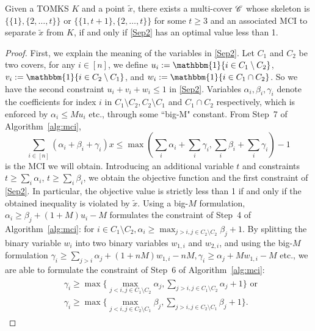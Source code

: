\begin{theorem}
\label{theo: sep_2}
Given a TOMKS $K$ and a point $\tilde x$, there exists a multi-cover $\mathscr{C}$ whose skeleton is $\{\{1\}, \{2, \ldots, t\}\}$ or $\{\{1,t+1\}, \{2, \ldots, t\}\}$ for some $t \geq 3$ and an associated MCI to separate $\tilde x$ from $K$, if and only if \eqref{Sep2} has an optimal value less than 1. 
\end{theorem}

\begin{proof}
First, we explain the meaning of the variables in \eqref{Sep2}. 
Let $C_1$ and $C_2$ be two covers, for any $i \in [n]$, we define $u_i := \mathbbm{1}\{i \in C_1 \setminus C_2\}$, $v_i := \mathbbm{1}\{i \in C_2 \setminus C_1\}$, and $w_i: = \mathbbm{1}\{i \in C_1 \cap C_2\}$. 
So we have the second constraint $u_i + v_i + w_i \leq 1$ in \eqref{Sep2}. 
Variables $\alpha_i, \beta_i, \gamma_i$ denote the coefficients for index $i$ in $C_1 \setminus C_2, C_2 \setminus C_1$ and $C_1 \cap C_2$ respectively, which is enforced by $\alpha_i \leq M u_i$ etc., through some ``big-M" constant. 
From Step~7 of Algorithm~\ref{alg:mci}, 
$$
\sum_{i \in [n]} (\alpha_i + \beta_i + \gamma_i) x \leq \max(\sum_{i} \alpha_i + \sum_{i} \gamma_i, \sum_{i} \beta_i + \sum_{i}\gamma_i) - 1
$$ 
is the MCI we will obtain. 
Introducing an additional variable $t$ and constraints $t \geq \sum_i \alpha_i$, $t \geq \sum_i \beta_i$, we obtain the objective function and the first constraint of \eqref{Sep2}. 
In particular, the objective value is strictly less than 1 if and only if the obtained inequality is violated by $\tilde x$. 
Using a big-$M$ formulation, $\alpha_i \geq \beta_j + (1+M)u_i - M$ formulates the constraint of Step~4 of Algorithm~\ref{alg:mci}: for $i \in C_1 \setminus C_2, \alpha_i \geq \max_{j >i, j \in C_2 \setminus C_2} \beta_j + 1$.
By splitting the binary variable $w_i$ into two binary variables $w_{1,i}$ and $w_{2,i}$, and using the big-$M$ formulation
$\gamma_i \geq \sum_{j>i} \alpha_j + (1+nM)w_{1,i} -nM, \gamma_i \geq  \alpha_j + Mw_{1,i}-M$ etc., we are able to formulate the constraint of Step~6 of Algorithm~\ref{alg:mci}: 
\begin{align*}
\begin{split}
& \gamma_i \geq \max\{\max_{j<i, j \in C_1 \setminus C_2} \alpha_j, \sum_{j>i, j \in C_1 \setminus C_2} \alpha_j + 1\} \text{ or }  \\
& \gamma_i \geq \max\{\max_{j<i, j \in C_2 \setminus C_1} \beta_j, \sum_{j>i, j \in C_2 \setminus C_1} \beta_j + 1\}.
\end{split}
\end{align*}


\end{proof}
